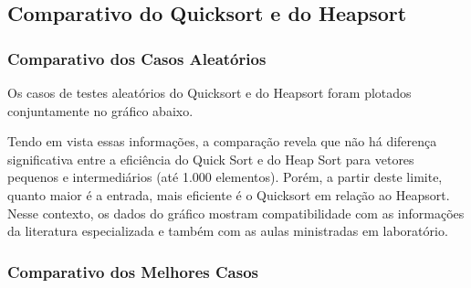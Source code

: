 \documentclass[a4paper, 12pt]{article}
\begin{document}
\subsection{Comparativo do Quicksort e do Heapsort}

\subsubsection{Comparativo dos Casos Aleatórios}

\tab{ }Os casos de testes aleatórios do Quicksort e do Heapsort foram plotados conjuntamente no gráfico abaixo.
\begin{center}
\end{center}


\vspace{0.8cm}
Tendo em vista essas informações, a comparação revela que não há diferença significativa entre a eficiência do Quick Sort e do Heap Sort para vetores pequenos e intermediários (até 1.000 elementos). Porém, a partir deste limite, quanto maior é a entrada, mais eficiente é o Quicksort em relação ao Heapsort. Nesse contexto, os dados do gráfico mostram compatibilidade com as informações da literatura especializada e também com as aulas ministradas em laboratório.


\subsubsection{Comparativo dos Melhores Casos}
\end{document}
